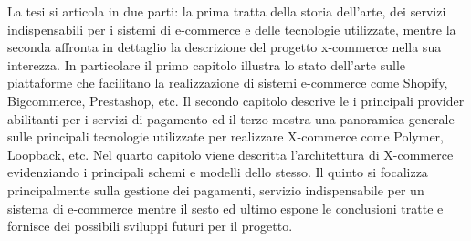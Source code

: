 La tesi si articola in due parti: la prima tratta della storia dell'arte, dei servizi indispensabili per i sistemi di e-commerce e delle tecnologie utilizzate, mentre la seconda affronta in dettaglio la descrizione del progetto x-commerce nella sua interezza.
In particolare il primo capitolo illustra lo stato dell’arte sulle piattaforme che facilitano la realizzazione di sistemi e-commerce come Shopify, Bigcommerce, Prestashop, etc.
Il secondo capitolo descrive le i principali provider abilitanti per i servizi di pagamento ed il terzo mostra una panoramica generale sulle principali tecnologie utilizzate per realizzare X-commerce come Polymer, Loopback, etc.
\newline
Nel quarto capitolo viene descritta l'architettura di X-commerce evidenziando i principali schemi e modelli dello stesso.
\newline
Il quinto si focalizza principalmente sulla gestione dei pagamenti, servizio indispensabile per un sistema di e-commerce mentre il sesto ed ultimo espone le conclusioni tratte e fornisce dei possibili sviluppi futuri per il progetto.
